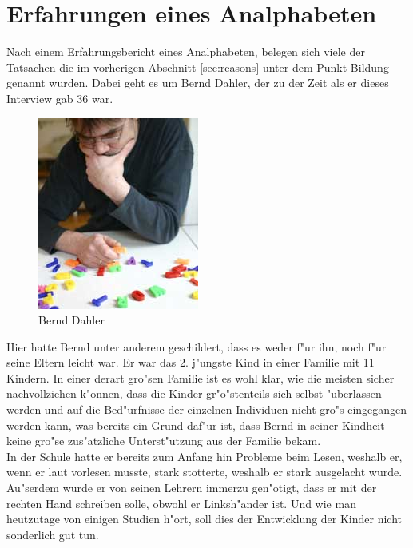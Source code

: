 \section{Erfahrungen eines Analphabeten}


Nach einem Erfahrungsbericht eines Analphabeten, belegen sich viele der Tatsachen die im vorherigen Abschnitt \ref{sec:reasons} unter dem Punkt Bildung genannt wurden. Dabei geht es um Bernd Dahler, der zu der Zeit als er dieses Interview gab 36 war.\\


\begin{figure}[h]
	\centering
		\includegraphics[scale=0.80]{Daten/BerndDahler.jpg}
	\caption{Bernd Dahler}
	\label{fig:BerndDahler}
\end{figure}



Hier hatte Bernd unter anderem geschildert, dass es weder f"ur ihn, noch f"ur seine Eltern leicht war. Er war das 2. j"ungste Kind in einer Familie mit 11 Kindern. In einer derart gro"sen Familie ist es wohl klar, wie die meisten sicher nachvollziehen k"onnen, dass die Kinder gr"o"stenteils sich selbst "uberlassen werden und auf die Bed"urfnisse der einzelnen Individuen nicht gro"s eingegangen werden kann, was bereits ein Grund daf"ur ist, dass Bernd in seiner Kindheit keine gro"se zus"atzliche Unterst"utzung aus der Familie bekam.\\

In der Schule hatte er bereits zum Anfang hin Probleme beim Lesen, weshalb er, wenn er laut vorlesen musste, stark stotterte, weshalb er stark ausgelacht wurde. Au"serdem wurde er von seinen Lehrern immerzu gen"otigt, dass er mit der rechten Hand schreiben solle, obwohl er Linksh"ander ist. Und wie man heutzutage von einigen Studien h"ort, soll dies der Entwicklung der Kinder nicht sonderlich gut tun.\\

